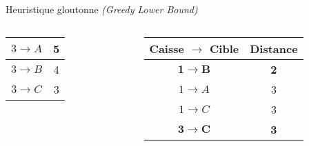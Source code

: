 \begin{frame}{Heuristique gloutonne \textit{(Greedy Lower Bound)}}
{\begin{columns}[onlytextwidth]
\begin{column}{0.5\textwidth}
{\begin{columns}[onlytextwidth]
\begin{column}{0.93\textwidth}
\begin{tabular}{ | c | c | }
                                        \hline
                                        $3 \rightarrow A$ & 5 \\
                                        \hline
                                        $3 \rightarrow B$ & 4 \\
                                        \hline
                                        $3 \rightarrow C$ & 3 \\
                                        \hline
                                    \end{tabular}
                                \end{column}
                                \begin{column}{0.07\textwidth}
                                \end{column}
                            \end{columns}
                        }
                    \end{column}%
                    \begin{column}{0.4\textwidth}%
                        \begin{tabular}{ | c | c | }
                            \hline
                                Caisse $\rightarrow$ Cible & Distance \\
                            \hline
                            $\mathbf{1 \rightarrow B}$ & \textbf{2} \\
                            \hline
                            $1 \rightarrow A$ & 3 \\
                            \hline
                            $1 \rightarrow C$ & 3 \\
                            \hline
                            $\mathbf{3 \rightarrow C}$ & \textbf{3} \\

\end{tabular}
\end{column}
\end{columns}}
\end{frame}
